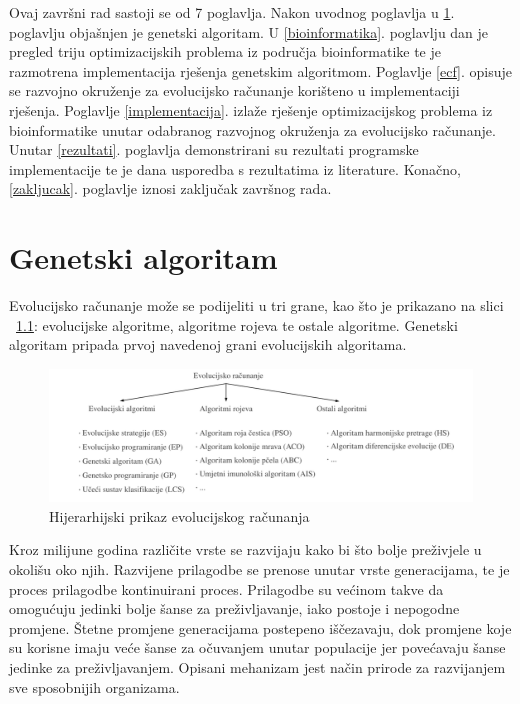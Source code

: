 \documentclass[times, utf8, zavrsni, numeric]{fer}
\begin{document}
Ovaj završni rad sastoji se od 7 poglavlja. Nakon uvodnog poglavlja u \ref{genetski}. poglavlju objašnjen je genetski algoritam.\newline\newline
U \ref{bioinformatika}. poglavlju dan je pregled triju optimizacijskih problema iz područja bioinformatike te je razmotrena implementacija rješenja genetskim algoritmom.\newline\newline
Poglavlje \ref{ecf}. opisuje se razvojno okruženje za evolucijsko računanje korišteno u implementaciji rješenja.\newline\newline
Poglavlje \ref{implementacija}. izlaže rješenje optimizacijskog problema iz bioinformatike unutar odabranog razvojnog okruženja za evolucijsko računanje.\newline\newline
Unutar \ref{rezultati}. poglavlja demonstrirani su rezultati programske implementacije te je dana usporedba s rezultatima iz literature.\newline\newline
Konačno, \ref{zakljucak}. poglavlje iznosi zaključak završnog rada.




\chapter{Genetski algoritam} \label{genetski}

Evolucijsko računanje može se podijeliti u tri grane, kao što je prikazano na slici ~\ref{fig:podjelaEvolucijskog}: evolucijske algoritme, algoritme rojeva te ostale algoritme. Genetski algoritam pripada prvoj navedenoj grani evolucijskih algoritama.
\begin{figure}[htb]
	\includegraphics[width=\linewidth]{slike/podjelaEvolucijskog.PNG}
	\centering
	\caption{Hijerarhijski prikaz evolucijskog računanja}
	\label{fig:podjelaEvolucijskog}
\end{figure}

Kroz milijune godina različite vrste se razvijaju kako bi što bolje preživjele u okolišu oko njih. Razvijene prilagodbe se prenose unutar vrste generacijama, te je proces prilagodbe kontinuirani proces. Prilagodbe su većinom takve da omogućuju jedinki bolje šanse za preživljavanje, iako postoje i nepogodne promjene. Štetne promjene generacijama postepeno iščezavaju, dok promjene koje su korisne imaju veće šanse za očuvanjem unutar populacije jer povećavaju šanse jedinke za preživljavanjem. Opisani mehanizam jest način prirode za razvijanjem sve sposobnijih organizama.
\end{document}
